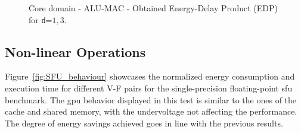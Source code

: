
\begin{figure}[!htb]
    \centering
    \begin{subfigmatrix}{2}
      \label{fig:MAC_EDP}
    \end{subfigmatrix}
    \caption{Core domain - ALU-MAC - Obtained Energy-Delay Product (EDP) for \texttt{d}=${1,3}$.}
\end{figure}

\newpage
\subsection{Non-linear Operations}

Figure~\ref{fig:SFU_behaviour} showcases the normalized energy consumption and execution time for different V-F pairs for the single-precision floating-point \acrshort{sfu} benchmark. The \acrshort{gpu} behavior displayed in this test is similar to the ones of the cache and shared memory, with the undervoltage not affecting the performance. The degree of energy savings achieved goes in line with the previous results.



